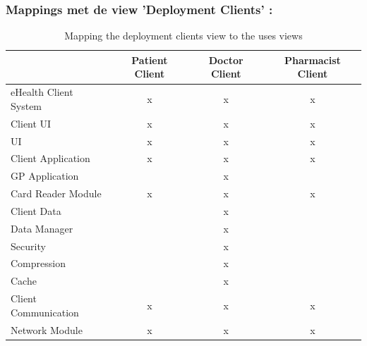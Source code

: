 \documentclass[a4paper,10pt]{article}
\begin{document}
\subsubsection{Mappings met de view 'Deployment Clients' : }
\begin{table}[h!]
\begin{center}
 \begin{tabular}{l| c | c | c |} 
 & Patient Client & Doctor Client & Pharmacist Client \\ \hline
eHealth Client System & x & x & x \\ \hline
\hspace{6pt}Client UI & x & x & x \\ \hline
\hspace{12pt}UI & x & x & x \\ \hline
\hspace{6pt}Client Application & x & x & x \\ \hline
\hspace{12pt}GP Application & & x & \\ \hline
\hspace{12pt}Card Reader Module & x & x & x \\ \hline
\hspace{6pt}Client Data & & x & \\ \hline
\hspace{12pt}Data Manager & & x & \\ \hline
\hspace{12pt}Security & & x & \\ \hline
\hspace{12pt}Compression & & x & \\ \hline
\hspace{12pt}Cache & & x & \\ \hline
\hspace{6pt}Client Communication & x & x & x \\ \hline
\hspace{12pt}Network Module & x & x & x \\ \hline
\end{tabular}
\caption{Mapping the deployment clients view to the uses views}
\end{center}
\end{table}

\clearpage
\end{document}
